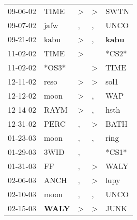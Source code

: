\begin{supertabular}{p{0.07\textwidth}p{0.06\textwidth}p{0.02\textwidth}p{0.02\textwidth}p{0.06\textwidth}}
 09-06-02\textsuperscript{} &           TIME\textsuperscript{} &     \textgreater &     \textgreater &           SWTN\textsuperscript{} \\
 09-07-02\textsuperscript{} &           jafw\textsuperscript{} &                , &                , &           UNCO\textsuperscript{} \\
 09-21-02\textsuperscript{} &           kabu\textsuperscript{} &     \textgreater &                , &  \textbf{kabu\textsuperscript{}} \\
 11-02-02\textsuperscript{} &           TIME\textsuperscript{} &     \textgreater &                  &                            *CS2* \\
 11-02-02\textsuperscript{} &                            *OS3* &                  &     \textgreater &           TIME\textsuperscript{} \\
 12-11-02\textsuperscript{} &           reso\textsuperscript{} &     \textgreater &     \textgreater &           sol1\textsuperscript{} \\
 12-12-02\textsuperscript{} &           moon\textsuperscript{} &     \textgreater &                , &            WAP\textsuperscript{} \\
 12-14-02\textsuperscript{} &           RAYM\textsuperscript{} &     \textgreater &                , &           hsth\textsuperscript{} \\
 12-31-02\textsuperscript{} &           PERC\textsuperscript{} &                , &     \textgreater &           BATH\textsuperscript{} \\
 01-23-03\textsuperscript{} &           moon\textsuperscript{} &                , &                , &           ring\textsuperscript{} \\
 01-29-03\textsuperscript{} &           3WID\textsuperscript{} &                , &                  &                            *CS1* \\
 01-31-03\textsuperscript{} &             FF\textsuperscript{} &                , &     \textgreater &           WALY\textsuperscript{} \\
 02-06-03\textsuperscript{} &           ANCH\textsuperscript{} &                , &     \textgreater &           lupy\textsuperscript{} \\
 02-10-03\textsuperscript{} &           moon\textsuperscript{} &                , &                , &           UNCO\textsuperscript{} \\
 02-15-03\textsuperscript{} &  \textbf{WALY\textsuperscript{}} &     \textgreater &     \textgreater &           JUNK\textsuperscript{} \\

\end{supertabular}
